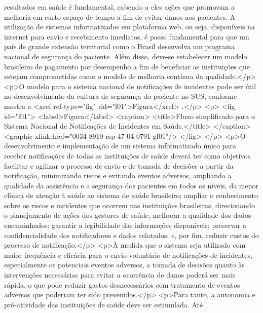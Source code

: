         resultados em saúde é fundamental, cabendo a eles ações que promovam a melhoria em curto
        espaço de tempo a fim de evitar danos aos pacientes. A utilização de sistemas informatizados
        em plataforma web, ou seja, disponíveis na internet para envio e recebimento imediatos, é
        passo fundamental para que um país de grande extensão territorial como o Brasil desenvolva
        um programa nacional de segurança do paciente. Além disso, deve-se estabelecer um modelo
        brasileiro de pagamento por desempenho a fim de beneficiar as instituições que estejam
        comprometidas como o modelo de melhoria contínua da qualidade.</p>
      <p>O modelo para o sistema nacional de notificações de incidentes pode ser útil no
        desenvolvimento da cultura de segurança do paciente no SUS, conforme mostra a <xref
          ref-type="fig" rid="f01">Figura</xref> .</p>
      <p>
        <fig id="f01">
          <label>Figura</label>
          <caption>
            <title>Fluxo simplificado para o Sistema Nacional de Notificações de Incidentes em
              Saúde.</title>
          </caption>
          <graphic xlink:href="0034-8910-rsp-47-04-0791-gf01"/>
        </fig>
      </p>
      <p>O desenvolvimento e implementação de um sistema informatizado único para receber
        notificações de todas as instituições de saúde deverá ter como objetivos facilitar e
        agilizar o processo de envio e de tomada de decisões a partir da notificação, minimizando
        riscos e evitando eventos adversos, ampliando a qualidade da assistência e a segurança dos
        pacientes em todos os níveis, da menor clínica de atenção à saúde ao sistema de saúde
        brasileiro; ampliar o conhecimento sobre os riscos e incidentes que ocorrem nas instituições
        brasileiras, direcionando o planejamento de ações dos gestores de saúde; melhorar a
        qualidade dos dados encaminhados; garantir a legibilidade das informações disponíveis;
        preservar a confidencialidade dos notificadores e dados relatados; e, por fim, reduzir
        custos do processo de notificação.</p>
      <p>À medida que o sistema seja utilizado com maior frequência e eficácia para o envio
        voluntário de notificações de incidentes, especialmente os potenciais eventos adversos, a
        tomada de decisões quanto às intervenções necessárias para evitar a ocorrência de danos
        poderá ser mais rápida, o que pode reduzir gastos desnecessários com tratamento de eventos
        adversos que poderiam ter sido prevenidos.</p>
      <p>Para tanto, a autonomia e pró-atividade das instituições de saúde deve ser estimulada. Até
